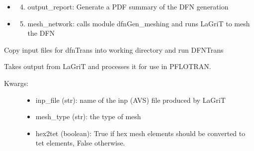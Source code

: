 \documentclass[letterpaper,10pt,english]{sphinxmanual}
\begin{document}
\begin{fulllineitems}
\begin{fulllineitems}
\begin{description}
\begin{itemize}
\begin{enumerate}
\end{enumerate}

\item {} \begin{enumerate}
\setcounter{enumi}{3}
\item {} 
output\_report: Generate a PDF summary of the DFN generation

\end{enumerate}

\item {} \begin{enumerate}
\setcounter{enumi}{4}
\item {} 
mesh\_network: calls module dfnGen\_meshing and runs LaGriT to mesh the DFN

\end{enumerate}

\end{itemize}

\end{description}

\end{fulllineitems}


\begin{fulllineitems}
\label{pydfnworks:pydfnworks.DFNWORKS.dfnTrans}
Copy input files for dfnTrans into working directory and run DFNTrans

\end{fulllineitems}


\begin{fulllineitems}
\label{pydfnworks:pydfnworks.DFNWORKS.lagrit2pflotran}
Takes output from LaGriT and processes it for use in PFLOTRAN.
\begin{description}
\item[{Kwargs:}] \leavevmode\begin{itemize}
\item {} 
inp\_file (str): name of the inp (AVS) file produced by LaGriT

\item {} 
mesh\_type (str): the type of mesh

\item {} 
hex2tet (boolean): True if hex mesh elements should be converted to tet elements, False otherwise.


\end{itemize}
\end{description}
\end{fulllineitems}
\end{fulllineitems}
\end{document}
